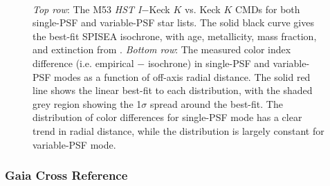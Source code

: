 \documentclass[]{spie}  %
\begin{document}
\begin{figure}[!h]
  \centering
  \\
  \hspace{-1.2cm}
  \caption{\textit{Top row}: The M53 \textit{HST I}$-$Keck $K$ vs. Keck $K$ CMDs for both single-PSF and variable-PSF star lists. The solid black curve gives the best-fit SPISEA isochrone, with age, metallicity, mass fraction, and extinction from \cite{dotter:2011a,wagner:2016a,schlafly:2016a}. \textit{Bottom row}: The measured color index difference (i.e. empirical $-$ isochrone) in single-PSF and variable-PSF modes as a function of off-axis radial distance. The solid red line shows the linear best-fit to each distribution, with the shaded grey region showing the 1$\sigma$ spread around the best-fit. The distribution of color differences for single-PSF mode has a clear trend in radial distance, while the distribution is largely constant for variable-PSF mode.} \label{fig:m53_cmd_colorshift}
\end{figure}

\clearpage

\subsubsection{Gaia Cross Reference} \label{sec:m53-gaia}
\end{document}
